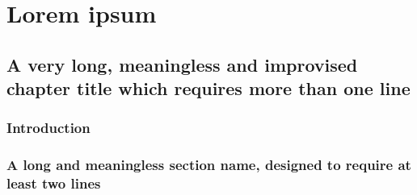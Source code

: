 \part{Lorem ipsum}

\chapter{A very long, meaningless and improvised chapter title which requires more than one line}

\section{Introduction}

\lipsum[1-2]


\section{A long and meaningless section name, designed to require at least two lines}

\lipsum[3-8]
